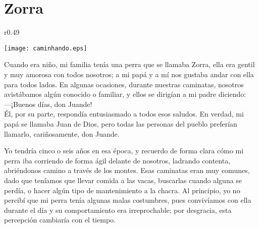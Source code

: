 \cleardoublepage
\newpage
\ifdefined\EnableIncludeImages
\fi
\chapter{Zorra}


\ifdefined\EnableIncludeImages
\begin{wrapfigure}{r}{0.49\textwidth}
  \begin{center}
  \vspace{-30pt}
    \texttt{[image: caminhando.eps]}
  \end{center}
  \vspace{-20pt}
\end{wrapfigure}
\fi
Cuando era niño, mi familia tenía una perra que se llamaba Zorra, ella era gentil y muy amorosa con todos nosotros; a mi papá y a mí nos gustaba andar con ella para todos lados. En algunas ocasiones, durante nuestras caminatas, nosotros avistábamos algún conocido o familiar, y ellos se dirigían a mi padre diciendo:\\\indent
---¡Buenos días, don Juande!\\\indent
Él, por su parte, respondía entusiasmado a todos esos saludos.
En verdad, mi papá se llamaba Juan de Dios, pero todas las personas del pueblo preferían llamarlo, cariñosamente, don Juande.

Yo tendría cinco o seis años en esa época, y recuerdo de forma clara cómo mi perra iba corriendo de forma ágil delante de nosotros, ladrando contenta, abriéndonos camino a través de los montes.
Esas caminatas eran muy comunes, dado que teníamos que llevar comida a las vacas, buscarlas cuando alguna se perdía, o hacer algún tipo de mantenimiento a la chacra.
Al principio, yo no percibí que mi perra tenía algunas malas costumbres, 
pues convivíamos con ella durante el día y su comportamiento era irreprochable; 
por desgracia, esta percepción cambiaría con el tiempo.

